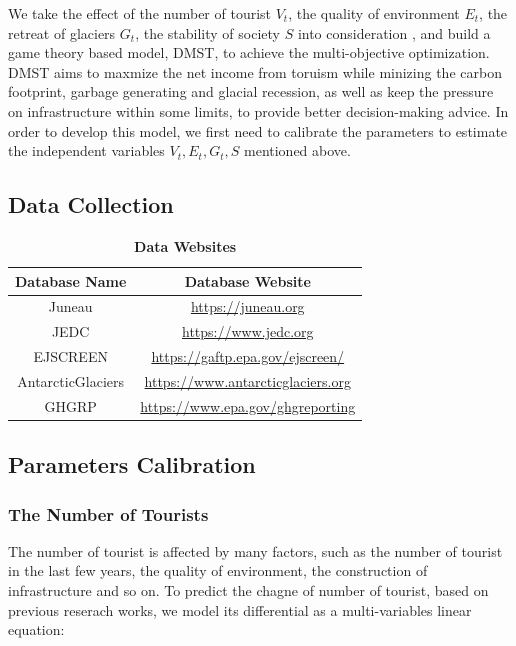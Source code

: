 \documentclass{mcmthesis}
\begin{document}
We take the effect of the number of tourist $V_t$, the quality of environment $E_t$, 
the retreat of glaciers $G_t$, the stability of society $S$ into consideration , 
and build a game theory based model\cite{Wang2021}, DMST, to achieve the multi-objective optimization.
DMST aims to maxmize the net income from toruism while minizing the carbon footprint,
garbage generating and glacial recession, as well as keep the pressure on infrastructure within some limits,
to provide better decision-making advice.
In order to develop this model, we first need to calibrate the parameters to estimate 
the independent variables $V_t, E_t, G_t, S$ mentioned above.

\subsection{Data Collection}
\begin{table}[H]
  \caption{\textbf{Data Websites}} 
  \centering
  \begin{tabular}{cc}
    \toprule 
      Database Name & Database Website \\
    \midrule
      Juneau & \href{https://juneau.org}{https://juneau.org} \\ 
      JEDC & \href{https://www.jedc.org}{https://www.jedc.org} \\
      EJSCREEN & \href{https://gaftp.epa.gov/ejscreen/}{https://gaftp.epa.gov/ejscreen/} \\ 
      AntarcticGlaciers & \href{https://www.antarcticglaciers.org}{https://www.antarcticglaciers.org} \\
      GHGRP & \href{https://www.epa.gov/ghgreporting}{https://www.epa.gov/ghgreporting} \\
    \bottomrule
  \end{tabular}
\end{table}

\subsection{Parameters Calibration}

\subsubsection{The Number of Tourists}
The number of tourist is affected by many factors, such as the number of tourist in the last few years, 
the quality of environment, the construction of infrastructure and so on. To predict the chagne of number of tourist,
based on previous reserach works\cite{johnston2005dynamic}, we model its differential as a multi-variables linear equation:
\end{document}
